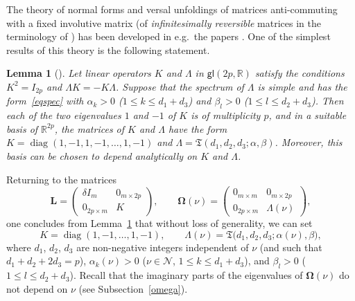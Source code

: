 \documentclass[12pt,reqno]{amsart}
\newtheorem{lem}{Lemma} \newtheorem{thm}{Theorem}
\theoremstyle{definition}
\begin{document}
The theory of normal forms and versal unfoldings of matrices anti-commuting
with a fixed involutive matrix (of \emph{infinitesimally reversible} matrices
in the terminology of \cite{S86,S92}) has been developed in e.g.\ the papers
\cite{H96,S92,Sh93}. One of the simplest results of this theory is the
following statement.

\begin{lem}[\cite{H96,S92,Sh93}]\label{lemKLam}
Let linear operators $K$ and $\Lambda$ in ${\mathsf{gl}}(2p,{\mathbb R})$ satisfy the conditions
$K^2=I_{2p}$ and $\Lambda K=-K\Lambda$. Suppose that the spectrum of $\Lambda$
is simple and has the form~\eqref{eqspec} with $\alpha_k>0$
\textup{(}$1{\leqslant} k{\leqslant} d_1+d_3$\textup{)} and $\beta_l>0$
\textup{(}$1{\leqslant} l{\leqslant} d_2+d_3$\textup{)}. Then each of the two eigenvalues
$1$ and $-1$ of $K$ is of multiplicity $p$, and in a suitable basis of
${\mathbb R}^{2p}$, the matrices of $K$ and $\Lambda$ have the form
$K=\operatorname{diag}(1,-1,1,-1,\ldots,1,-1)$ and $\Lambda={\mathfrak T}(d_1,d_2,d_3;\alpha,\beta)$.
Moreover, this basis can be chosen to depend analytically on $K$ and
$\Lambda$.
\end{lem}

Returning to the matrices
\[
{\mathbf L}=\begin{pmatrix}
\delta I_m & 0_{m\times 2p} \\ 0_{2p\times m} & K
\end{pmatrix}, \qquad
{\mathbf{\Omega}}(\nu)=\begin{pmatrix}
0_{m\times m} & 0_{m\times 2p} \\ 0_{2p\times m} & \Lambda(\nu)
\end{pmatrix},
\]
one concludes from Lemma~\ref{lemKLam} that without loss of generality, we can
set
\[
K=\operatorname{diag}(1,-1,\ldots,1,-1), \qquad
\Lambda(\nu)={\mathfrak T}\bigl(d_1,d_2,d_3;\alpha(\nu),\beta\bigr),
\]
where $d_1$, $d_2$, $d_3$ are non-negative integers independent of $\nu$ (and
such that $d_1+d_2+2d_3=p$), $\alpha_k(\nu)>0$ ($\nu\in{\mathcal N}$,
$1{\leqslant} k{\leqslant} d_1+d_3$), and $\beta_l>0$ ($1{\leqslant} l{\leqslant} d_2+d_3$). Recall that
the imaginary parts of the eigenvalues of ${\mathbf{\Omega}}(\nu)$ do not depend on
$\nu$ (see Subsection~\ref{omega}).
\end{document}
